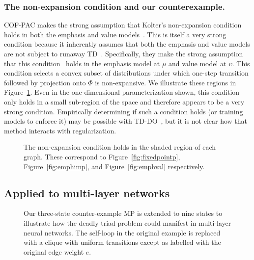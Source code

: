 \subsubsection{The non-expansion condition and our counterexample. }
COF-PAC makes the strong assumption that Kolter's non-expansion condition~\cite[eqn.~10]{kolter2011fixed} holds in both the emphasis and value models~\cite[asm.~4]{zhang2020provably}. This is itself a very strong condition because it inherently assumes that both the emphasis and value models are not subject to runaway TD~\cite[asm.~4]{zhang2020provably}. Specifically, they make the strong assumption that this condition~\cite[eqn.~10]{kolter2011fixed} holds in the emphasis model at $\mu$ and value model at $\upsilon$. This condition selects a convex subset of distributions under which one-step transition followed by projection onto $\Phi$ is non-expansive. We illustrate these regions in Figure~\ref{fig:koldercond}. Even in the one-dimensional parameterization shown, this condition only holds in a small sub-region of the space and therefore appears to be a very strong condition. Empirically determining if such a condition holds (or training models to enforce it) may be possible with TD-DO~\cite[sec~4.1]{kolter2011fixed}, but it is not clear how that method interacts with regularization.~\label{sec:nosingularity}

\begin{figure}
	\centering
	
	\caption{The non-expansion condition holds in the shaded region of each graph. These correspond to Figure~\ref{fig:fixedpointp}, Figure~\ref{fig:emphimp}, and Figure~\ref{fig:emphval} respectively. }
	\label{fig:koldercond}
\end{figure}


\subsection{Applied to multi-layer networks}
\label{sec:multilayer}


\begin{figure}
	
	\caption{Our three-state counter-example MP is extended to nine states to illustrate how the deadly triad problem could manifest in multi-layer neural networks. The self-loop in the original example is replaced with a clique with uniform transitions except as labelled with the original edge weight $e$. }
	\label{fig:mdp9_illustration}
\end{figure}


